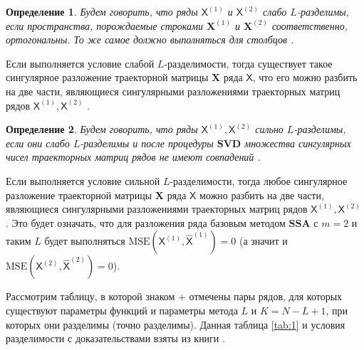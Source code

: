 \documentclass[a4paper, 11pt]{article}
\newcommand{\SSA}{\textbf{SSA}}
\newcommand{\TS}{\mathsf{X}}
\newtheorem{definition}{Определение} %
\begin{document}
\begin{definition}
	Будем говорить, что ряды $\TS^{(1)}$ и $\TS^{(2)}$ слабо $L$-разделимы, если пространства, порождаемые строками $\mathbf{X}^{(1)}$ и $\mathbf{X}^{(2)}$ соответственно, ортогональны. То же самое должно выполняться для столбцов \cite{golyandina2001analysis}.
\end{definition}

Если выполняется условие слабой $L$-разделимости, тогда существует такое сингулярное разложение траекторной матрицы $\mathbf X$ ряда $\TS$, что его можно разбить на две части, являющиеся сингулярными разложениями траекторных матриц рядов $\TS^{(1)}, \TS^{(2)}$ \cite{golyandina2001analysis}.

\begin{definition}
	Будем говорить, что ряды $\TS^{(1)}, \TS^{(2)}$ сильно $L$-разделимы, если они слабо $L$-разделимы и после процедуры $\mathbf{SVD}$ множества сингулярных чисел траекторных матриц рядов не имеют совпадений \cite{golyandina2001analysis}.
\end{definition}

Если выполняется условие сильной $L$-разделимости, тогда любое сингулярное разложение траекторной матрицы $\mathbf X$ ряда $\TS$ можно разбить на две части, являющиеся сингулярными разложениями траекторных матриц рядов $\TS^{(1)}, \TS^{(2)}$ \cite{golyandina2001analysis}. Это будет означать, что для разложения ряда базовым методом $\SSA$ с $m = 2$ и таким $L$ будет выполняться
\( \mathrm{MSE}\left(\TS^{(1)}, \hat{\TS}^{(1)}\right) = 0 \) (а значит и \( \mathrm{MSE}\left(\TS^{(2)}, \hat{\TS}^{(2)}\right) = 0 \)).


Рассмотрим таблицу, в которой знаком + отмечены пары рядов, для которых существуют параметры функций и параметры метода $L$ и $ K = N - L +1$, при которых они разделимы (точно разделимы). Данная таблица \ref{tab:1} и условия разделимости с доказательствами взяты из книги \cite{golyandina2001analysis}.

\begin{table}[H]
	\begin{center}
		\caption{Точная разделимость}
		\label{tab:1}
	\end{center}
\end{table}
\end{document}
